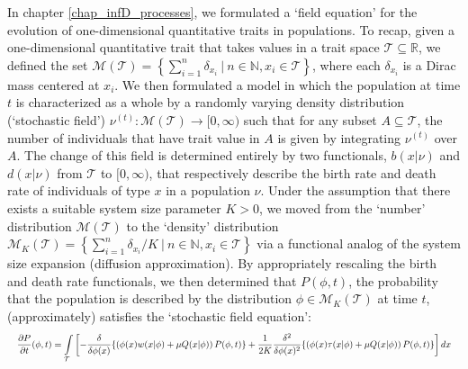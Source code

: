 In chapter \ref{chap_infD_processes}, we formulated a `field equation' for the evolution of one-dimensional quantitative traits in populations. To recap, given a one-dimensional quantitative trait that takes values in a trait space $\mathcal{T} \subseteq \mathbb{R}$, we defined the set $\mathcal{M}(\mathcal{T}) =  \left\{\sum_{i=1}^{n}\delta_{x_i} \ | \ n \in \mathbb{N}, x_i \in \mathcal{T}\right\}$, where each $\delta_{x_i}$ is a Dirac mass centered at $x_i$. We then formulated a model in which the population at time $t$ is characterized as a whole by a randomly varying density distribution (`stochastic field') $\nu^{(t)}: \mathcal{M}(\mathcal{T}) \to [0,\infty)$ such that for any subset $A \subseteq \mathcal{T}$, the number of individuals that have trait value in $A$ is given by integrating $\nu^{(t)}$ over $A$. The change of this field is determined entirely by two functionals, $b(x|\nu)$ and $d(x|\nu)$ from $\mathcal{T}$ to $[0,\infty)$, that respectively describe the birth rate and death rate of individuals of type $x$ in a population $\nu$. Under the assumption that there exists a suitable system size parameter $K > 0$, we moved from the `number' distribution $\mathcal{M}(
\mathcal{T})$ to the `density' distribution $\mathcal{M}_{K}(\mathcal{T}) =  \left\{\sum_{i=1}^{n}\delta_{x_i}/K \ | \ n \in \mathbb{N}, x_i \in \mathcal{T}\right\}$ via a functional analog of the system size expansion (diffusion approximation). By appropriately rescaling the birth and death rate functionals, we then determined that $P(\phi,t)$, the probability that the population is described by the distribution $\phi \in \mathcal{M}_{K}(\mathcal{T})$ at time $t$, (approximately) satisfies the `stochastic field equation':
\begin{equation}
\label{disc_functional_field_eqns}
\resizebox{\textwidth}{!}{$\displaystyle
\frac{\partial P}{\partial t}(\phi,t) = \int\limits_{\mathcal{T}}\left[-
\frac{\delta}{\delta\phi(x)} \{ \left(\phi(x) w(x|\phi) + \mu Q(x|\phi)\right) P(\phi,t) \} + \frac{1}{2K}\frac{\delta^2}{\delta\phi(x)^2}\{\left(\phi(x) \tau(x|\phi) + \mu Q(x|\phi)\right)P(\phi,t)\}\right]dx$}
\end{equation}

